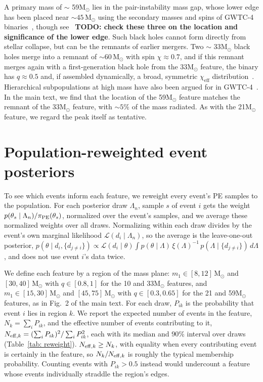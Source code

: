 \documentclass[%
 onecolumn,
 amsmath,amssymb,
 aps,
 prl,
 nofootinbib,nobibnotes,
]{revtex4-2}
\newcommand{\Msun}{\ensuremath{\mathrm{M}_{\odot}}}
\newcommand{\chieff}{\ensuremath{\chi_{\mathrm{eff}}}}
\newcommand{\red}[1]{{\color{Red} #1}}
\newcommand{\todo}[1]{{\color{Blue}\bf TODO: #1}}
\newcommand{\featTen}{10\xspace}
\newcommand{\featTwenty}{21\xspace}
\newcommand{\featThirtyFive}{33\xspace}
\newcommand{\featSixty}{59\xspace}
\begin{document}
A primary mass of $\sim$ \featSixty $\Msun$ lies in the pair-instability mass gap, whose lower edge has been placed near $\sim 45\,\Msun$ using the secondary masses and spins of \ac{GWTC-4} binaries~\cite{Tong:2025wpz, Antonini:2025ilj}, though see~\cite{Ray:2025xti} \todo{check these three on the location and significance of the lower edge}. Such black holes cannot form directly from stellar collapse, but can be the remnants of earlier mergers. Two $\sim$ \featThirtyFive $\Msun$ black holes merge into a remnant of $\sim 60\,\Msun$ with spin $\chi \approx 0.7$, and if this remnant merges again with a first-generation black hole from the \featThirtyFive $\Msun$ feature, the binary has $q \approx 0.5$ and, if assembled dynamically, a broad, symmetric $\chieff$ distribution~\cite{Rodriguez:2019huv, Kimball:2020opk, Gerosa:2021mno, Antonini:2024het}. Hierarchical subpopulations at high mass have also been argued for in \ac{GWTC-4}~\cite{Plunkett:2026pxt, Li:2025iux}. In the main text, we find that the location of the \featSixty $\Msun$ feature matches the remnant of the \featThirtyFive $\Msun$ feature, with $\sim 5\%$ of the mass radiated. As with the \featTwenty $\Msun$ feature, we regard the peak itself as tentative.

\section{Population-reweighted event posteriors}
\label{sm: reweight}

\red{To see which events inform each feature, we reweight every event's \ac{PE} samples to the population. For each posterior draw $\Lambda_n$, sample $s$ of event $i$ gets the weight $p(\theta_s \mid \Lambda_n)/\pi_{\rm PE}(\theta_s)$, normalized over the event's samples, and we average these normalized weights over all draws. Normalizing within each draw divides by the event's own marginal likelihood $\mathcal{L}(d_i \mid \Lambda_n)$, so the average is the leave-one-out posterior, $p(\theta \mid d_i, \{d_{j \neq i}\}) \propto \mathcal{L}(d_i \mid \theta) \int p(\theta \mid \Lambda)\, \xi(\Lambda)^{-1}\, p(\Lambda \mid \{d_{j \neq i}\})\, d\Lambda$, and does not use event $i$'s data twice.}

\red{We define each feature by a region of the mass plane: $m_1 \in [8, 12]\,\Msun$ and $[30, 40]\,\Msun$ with $q \in [0.8, 1]$ for the \featTen and \featThirtyFive $\Msun$ features, and $m_1 \in [15, 30]\,\Msun$ and $[45, 75]\,\Msun$ with $q \in [0.3, 0.65]$ for the \featTwenty and \featSixty $\Msun$ features, as in Fig.~2 of the main text. For each draw, $P_{ik}$ is the probability that event $i$ lies in region $k$. We report the expected number of events in the feature, $N_k = \sum_i P_{ik}$, and the effective number of events contributing to it, $N_{{\rm eff}, k} = (\sum_i P_{ik})^2/\sum_i P_{ik}^2$, each with its median and 90\% interval over draws (Table~\ref{tab: reweight}). $N_{{\rm eff}, k} \geq N_k$, with equality when every contributing event is certainly in the feature, so $N_k/N_{{\rm eff}, k}$ is roughly the typical membership probability. Counting events with $P_{ik} > 0.5$ instead would undercount a feature whose events individually straddle the region's edges.}
\end{document}

